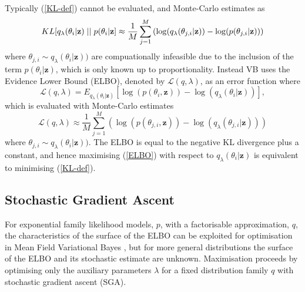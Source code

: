 \documentclass[12pt,a4paper]{article}\usepackage[]{graphicx}\usepackage[]{color}
\begin{document}
Typically (\ref{KL-def}) cannot be evaluated, and Monte-Carlo estimates as
\begin{equation}
\label{KL-MC}
KL[q_{\lambda}(\theta_i | \textbf{z})\hspace{.1cm}||\hspace{.1cm}p(\theta_i | \textbf{z}] \approx \frac{1}{M}\sum_{j=1}^M \left(\log(q_{\lambda}(\theta_{j, i} | \textbf{z})) - \log(p(\theta_{j, i} | \textbf{z})) \right)
\end{equation}
where $\theta_{j, i} \sim q_{\lambda}(\theta_i | \textbf{z}))$ are compuationally infeasible due to the inclusion of the term $p(\theta_i | \textbf{z})$, which is only known up to proportionality. Instead VB uses the Evidence Lower Bound (ELBO), denoted by $\mathcal{L}(q, \lambda)$, as an error function where
\begin{equation}
\label{ELBO}
\mathcal{L}(q, \lambda) = E_{q_{\lambda}(\theta_i | \textbf{z})} \left[\log(p(\theta_i, \textbf{z})) - \log(q_{\lambda}(\theta_i | \textbf{z}))\right],
\end{equation}
which is evaluated with Monte-Carlo estimates
\begin{equation}
\label{ELBO-MC}
\mathcal{L}(q, \lambda) \approx \frac{1}{M} \sum_{j=1}^M \left(\log(p(\theta_{j, i}, \textbf{z})) - \log(q_{\lambda}(\theta_{j, i} | \textbf{z})) \right)
\end{equation}
where $\theta_{j, i} \sim q_{\lambda}(\theta_i | \textbf{z}))$. The ELBO is equal to the negative KL divergence plus a constant, and hence maximising (\ref{ELBO}) with respect to $q_{\lambda}(\theta_i | \textbf{z})$ is equivalent to minimising (\ref{KL-def}).

\subsection{Stochastic Gradient Ascent}
\label{subsec:SGA}
For exponential family likelihood models, $p$, with a factorisable approximation, $q$, the characteristics of the surface of the ELBO can be exploited for optimisation in Mean Field Variational Bayes \citep{Ghahramani2000, Wainwright2008}, but for more general distributions the surface of the ELBO and its stochastic estimate are unknown. Maximisation proceeds by optimising only the auxiliary parameters $\lambda$ for a fixed distribution family $q$ with stochastic gradient ascent (SGA).
\\
\end{document}
